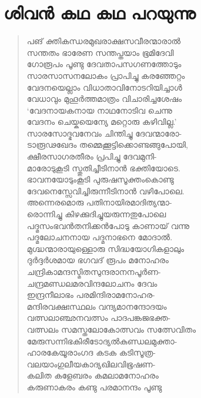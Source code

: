 \section{ശിവന്‍ കഥ കഥ പറയുന്നു}

\begin{verse}
പങ് ക്തികന്ധരമുഖരാക്ഷസവീരന്മാരാല്‍\\
സന്തതം ഭാരേണ സന്തപ്തയാം ഭൂമിദേവി\\
ഗോരൂപം പൂണ്ടു ദേവതാപസഗണത്തോടും\\
സാരസാസനലോകം പ്രാപിച്ചു കരഞ്ഞേറ്റം\\
വേദനയെല്ലാം വിധാതാവിനോടറിയിച്ചാള്‍\\
വേധാവും മുഹൂര്‍ത്തമാത്രം വിചാരിച്ചശേഷം\\
‘വേദനായകനായ നാഥനോടിവ ചെന്നു\\
വേദനം ചെയ്കയെന്യേ മറ്റൊരു കഴിവില്ല.’\\
സാരസോദ്ഭവനേവം ചിന്തിച്ചു ദേവന്മാരോ-\\
ടാരൂഢഖേദം തമ്മെക്കൂട്ടിക്കൊണ്ടങ്ങുപോയി,\\
ക്ഷീരസാഗരതീരം പ്രപിച്ചു ദേവമുനി-\\
മാരോടുകൂടി സ്തുതിച്ചീടിനാന്‍ ഭക്തിയോടെ.\\
ഭാവനയോടുംകൂടി പുരുഷസൂക്തംകൊണ്ടു\\
ദേവനെസ്സേവിച്ചിരുന്നീടിനാന്‍ വഴിപോലെ.\\
അന്നെരമൊരു പതിനായിരമാദിത്യന്മാ-\\
രൊന്നിച്ചു കിഴക്കുദിച്ചുയരുന്നതുപോലെ\\
പദ്മസംഭവന്‍തനിക്കന്‍പോടു കാണായ് വന്നു\\
പദ്മലോചനനായ പദ്മനാഭനെ മോദാല്‍.\\
മുഗ്ദ്ധന്മാരായുള്ളൊരു സിദ്ധയോഗികളാലും\\
ദുര്‍ദ്ദര്‍ശമായ ഭഗവദ് രൂപം മനോഹരം\\
ചന്ദ്രികാമന്ദസ്മിതസുന്ദരാനനപൂര്‍ണ-\\
ചന്ദ്രമണ്ഡലമരവിന്ദലോചനം ദേവം\\
ഇന്ദ്രനീലാഭം പരമിന്ദിരാമനോഹര-\\
മന്ദിരവക്ഷഃസ്ഥലം വന്ദ്യമാനന്ദോദയം\\
വത്സലാഞ്ഛനവത്സം പാദപങ്കജഭക്ത-\\
വത്സലം സമസ്തലോകോത്സവം സത്സേവിതം\\
മേരുസന്നിഭകിരീടോദ്യല്‍കുണ്ഡലമുക്താ-\\
ഹാരകേയൂരാംഗദ കടക കടിസൂത്ര-\\
വലയാംഗുലീയകാദ്യഖിലവിഭൂഷണ-\\
കലിത കളേബരം കമലാമനോഹരം\\
കരുണാകരം കണ്ടു പരമാനന്ദം പൂണ്ടു\\

\end{verse}
